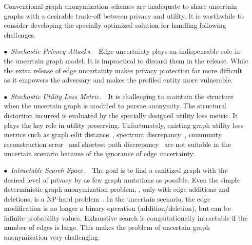 Conventional graph anonymization schemes are inadequate to share uncertain graphs with a desirable trade-off between privacy and utility. 
It is worthwhile to consider developing the specially optimized solution for handling following challenges. 

$\bullet$~\textup{\emph{Stochastic Privacy Attacks.}}~~Edge uncertainty plays an indispensable role in the uncertain graph model. It is impractical to discard them in the release.  
While the extra release of edge uncertainty makes privacy protection far more difficult as it empowers the adversary and makes the profiled entity more vulnerable. 

$\bullet$~\textup{\emph{Stochastic Utility Loss Metric.}}~~It is challenging to maintain the structure when the uncertain graph is modified to pursue anonymity. 
The structural distortion incurred is evaluated by the specially designed utility loss metric.  
It plays the key role in utility preserving. 
Unfortunately, existing graph utility loss metrics such as graph edit distance~\cite{Liu_Towards_2008}, spectrum discrepancy~\cite{Ying_Randomizing_2008}, community reconstruction error~\cite{Wang2011} and shortest path discrepancy~\cite{Liu_Privacy_2009} are not suitable in the uncertain scenario because of the ignorance of edge uncertainty.

$\bullet$~\textup{\emph{Intractable Search Space.}}~~The goal is to find a sanitized graph with the desired level of privacy by as few graph mutations as possible. 
Even the simple deterministic graph anonymization problem, {\ie}, only with edge additions and deletions, is a NP-hard problem~\cite{Hartung_Theory_2015}. 
In the uncertain scenario, the edge modification is no longer a binary operation (addition/deletion), but can be infinite probability values. Exhaustive search is computationally intractable if the number of edges is large. 
This makes the problem of uncertain graph anonymization very challenging. 

